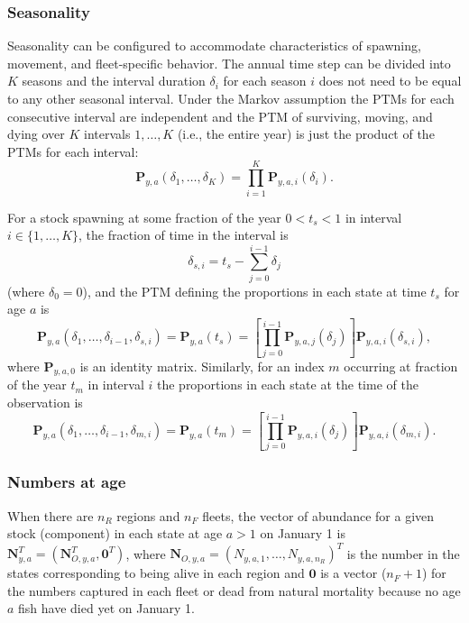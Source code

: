 \documentclass[
]{article}
\begin{document}
\hypertarget{seasonality}{%
\subsubsection*{Seasonality}\label{seasonality}}

Seasonality can be configured to accommodate characteristics of spawning, movement, and fleet-specific behavior. The annual time step can be divided into \(K\) seasons and the interval duration \(\delta_i\) for each season \(i\) does not need to be equal to any other seasonal interval. Under the Markov assumption the PTMs for each consecutive interval are independent and the PTM of surviving, moving, and dying over \(K\) intervals \(1,\ldots, K\) (i.e., the entire year) is just the product of the PTMs for each interval:
\[ \mathbf{P}_{y,a}(\delta_1,\ldots,\delta_K) = \prod^K_{i=1}\mathbf{P}_{y,a,i}(\delta_i).\]

For a stock spawning at some fraction of the year \(0<t_s<1\) in interval \(i \in \{1,\ldots,K\}\), the fraction of time in the interval is
\[\delta_{s,i} = t_s-\sum^{i-1}_{j=0}\delta_j\]
(where \(\delta_0 = 0\)), and the PTM defining the proportions in each state at time \(t_s\) for age \(a\) is
\begin{equation}\label{eq:ptm_spawn}
\mathbf{P}_{y,a}\left(\delta_1,\ldots,\delta_{i-1}, \delta_{s,i}\right) = \mathbf{P}_{y,a}\left(t_s\right) =  \left[\prod^{i-1}_{j=0}\mathbf{P}_{y,a,j}(\delta_j)\right]\mathbf{P}_{y,a,i}(\delta_{s,i}),
\end{equation}
where \(\mathbf{P}_{y,a,0}\) is an identity matrix. Similarly, for an index \(m\) occurring at fraction of the year \(t_m\) in interval \(i\) the proportions in each state at the time of the observation is
\begin{equation} \label{eq:ptm_index} 
\mathbf{P}_{y,a}\left(\delta_1,\ldots,\delta_{i-1}, \delta_{m,i}\right) = \mathbf{P}_{y,a}\left(t_m\right) =   \left[\prod^{i-1}_{j=0}\mathbf{P}_{y,a,i}(\delta_j)\right]\mathbf{P}_{y,a,i}(\delta_{m,i}).
\end{equation}

\hypertarget{numbers-at-age}{%
\subsubsection*{Numbers at age}\label{numbers-at-age}}

When there are \(n_R\) regions and \(n_F\) fleets, the vector of abundance for a given stock (component) in each state at age \(a>1\) on January 1 is \(\mathbf{N}_{y,a}^T = (\mathbf{N}_{O,y,a}^T, \mathbf{0}^T)\), where \(\mathbf{N}_{O,y,a} = (N_{y,a,1}, \ldots, N_{y,a,n_R})^T\) is the number in the states corresponding to being alive in each region and \(\mathbf{0}\) is a vector (\(n_F+1\)) for the numbers captured in each fleet or dead from natural mortality because no age \(a\) fish have died yet on January 1.
\end{document}
